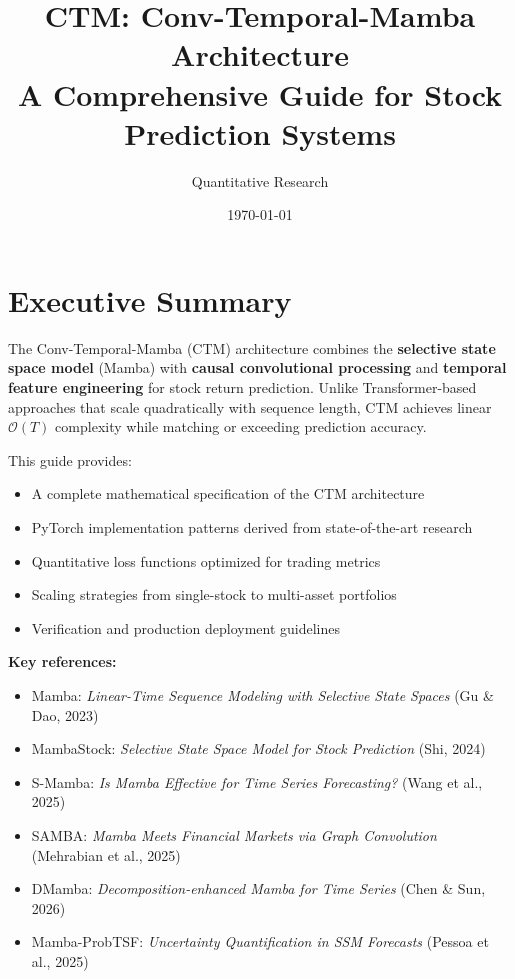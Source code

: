 \documentclass[11pt,a4paper]{article}
\title{\textbf{CTM: Conv-Temporal-Mamba Architecture} \\[4pt]
       \large A Comprehensive Guide for Stock Prediction Systems}
\author{Quantitative Research}
\date{\today}
\begin{document}
\maketitle
\thispagestyle{empty}
\newpage

\tableofcontents
\newpage

\section{Executive Summary}

The Conv-Temporal-Mamba (CTM) architecture combines the \textbf{selective state
space model} (Mamba) with \textbf{causal convolutional processing} and
\textbf{temporal feature engineering} for stock return prediction. Unlike
Transformer-based approaches that scale quadratically with sequence length,
CTM achieves linear $\mathcal{O}(T)$ complexity while matching or exceeding
prediction accuracy.

This guide provides:
\begin{itemize}[nosep]
  \item A complete mathematical specification of the CTM architecture
  \item PyTorch implementation patterns derived from state-of-the-art research
  \item Quantitative loss functions optimized for trading metrics
  \item Scaling strategies from single-stock to multi-asset portfolios
  \item Verification and production deployment guidelines
\end{itemize}

\noindent\textbf{Key references:}
\begin{itemize}[nosep]
  \item Mamba: \textit{Linear-Time Sequence Modeling with Selective State Spaces} (Gu \& Dao, 2023)
  \item MambaStock: \textit{Selective State Space Model for Stock Prediction} (Shi, 2024)
  \item S-Mamba: \textit{Is Mamba Effective for Time Series Forecasting?} (Wang et al., 2025)
  \item SAMBA: \textit{Mamba Meets Financial Markets via Graph Convolution} (Mehrabian et al., 2025)
  \item DMamba: \textit{Decomposition-enhanced Mamba for Time Series} (Chen \& Sun, 2026)
  \item Mamba-ProbTSF: \textit{Uncertainty Quantification in SSM Forecasts} (Pessoa et al., 2025)
\end{itemize}
\end{document}
